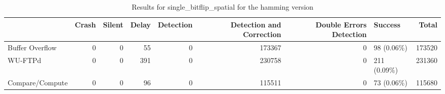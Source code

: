 \begin{table}[t]
	\centering
	\caption{Results for single_bitflip_spatial for the hamming version}
	\label{table:end_sim_by_status_hamming_5_single_bitflip_spatial}
	\begin{tabular}{lrrrrrrlr}
		\toprule
		                & Crash & Silent & Delay & Detection & Detection and Correction & Double Errors Detection & Success      & Total  \\
		\midrule
		Buffer Overflow & 0     & 0      & 55    & 0         & 173367                   & 0                       & 98 (0.06\%)  & 173520 \\
		WU-FTPd         & 0     & 0      & 391   & 0         & 230758                   & 0                       & 211 (0.09\%) & 231360 \\
		Compare/Compute & 0     & 0      & 96    & 0         & 115511                   & 0                       & 73 (0.06\%)  & 115680 \\
		\bottomrule
	\end{tabular}
\end{table}
